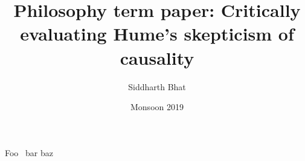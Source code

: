 \documentclass{article}
\title{Philosophy term paper: Critically evaluating Hume's skepticism of causality}
\author{Siddharth Bhat}
\date{Monsoon 2019}
\begin{document}
\maketitle
 
\cite{ottenstein1990program}
Foo~\cite{companion} bar baz~\cite{knuth:ct:a}
 
\printbibliography
 
\end{document}
